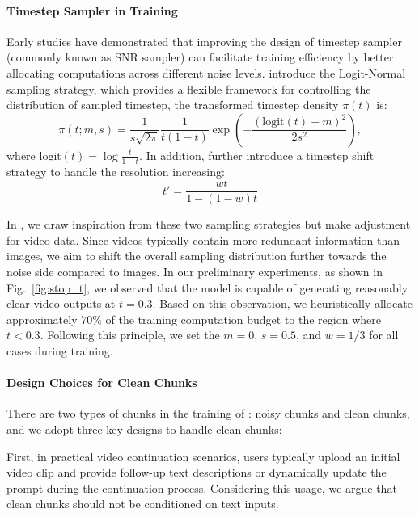 
\paragraph{Timestep Sampler in Training}
Early studies have demonstrated that improving the design of timestep sampler (commonly known as SNR sampler) can facilitate training efficiency by better allocating computations across different noise levels. \citep{esser2024scaling} introduce the Logit-Normal sampling strategy, which provides a flexible framework for controlling the distribution of sampled timestep, the transformed timestep density $\pi(t)$ is:
\begin{equation}
\pi(t; m, s) = \frac{1}{s\sqrt{2\pi}}\frac{1}{t(1-t)}\exp(-\frac{(\text{logit}(t)-m)^2}{2s^2}),
\end{equation}
where $\text{logit}(t)=\log \frac{t}{1-t}$. In addition, \citep{esser2024scaling} further introduce a timestep shift strategy to handle the resolution increasing:
\begin{equation}
\label{eq:t_scale_transform}
    t' = \frac{wt}{1 - (1-w)t}
\end{equation}

In \magi, we draw inspiration from these two sampling strategies but make adjustment for video data. Since videos typically contain more redundant information than images, we aim to shift the overall sampling distribution further towards the noise side compared to images. In our preliminary experiments, as shown in Fig.~\ref{fig:stop_t}, we observed that the model is capable of generating reasonably clear video outputs at $t = 0.3$. Based on this observation, we heuristically allocate approximately $70\%$ of the training computation budget to the region where $t < 0.3$. Following this principle, we set the $m = 0$, $s = 0.5$, and $w = 1/3$ for all cases during training.




\paragraph{Design Choices for Clean Chunks}
There are two types of chunks in the training of \magi: noisy chunks and clean chunks, and we adopt three key designs to handle clean chunks:

First, in practical video continuation scenarios, users typically upload an initial video clip and provide follow-up text descriptions or dynamically update the prompt during the continuation process. Considering this usage, we argue that clean chunks should not be conditioned on text inputs.

